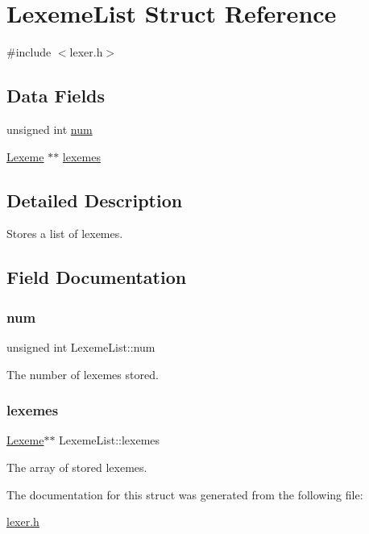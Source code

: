 \hypertarget{struct_lexeme_list}{}\section{Lexeme\+List Struct Reference}
\label{struct_lexeme_list}


{\ttfamily \#include $<$lexer.\+h$>$}

\subsection*{Data Fields}
\begin{DoxyCompactItemize}
\item 
unsigned int \hyperlink{struct_lexeme_list_ab9e4971353dc5b435d604d3dbaef1857}{num}
\item 
\hyperlink{struct_lexeme}{Lexeme} $\ast$$\ast$ \hyperlink{struct_lexeme_list_a26e2c4bffe56f01e4d9b7c14ced653fd}{lexemes}
\end{DoxyCompactItemize}


\subsection{Detailed Description}
Stores a list of lexemes. 

\subsection{Field Documentation}
\mbox{\label{struct_lexeme_list_ab9e4971353dc5b435d604d3dbaef1857}} 
\subsubsection{\texorpdfstring{num}{num}}
{\footnotesize\ttfamily unsigned int Lexeme\+List\+::num}

The number of lexemes stored. \mbox{\label{struct_lexeme_list_a26e2c4bffe56f01e4d9b7c14ced653fd}} 
\subsubsection{\texorpdfstring{lexemes}{lexemes}}
{\footnotesize\ttfamily \hyperlink{struct_lexeme}{Lexeme}$\ast$$\ast$ Lexeme\+List\+::lexemes}

The array of stored lexemes. 

The documentation for this struct was generated from the following file\+:\begin{DoxyCompactItemize}
\item 
\hyperlink{lexer_8h}{lexer.\+h}\end{DoxyCompactItemize}
